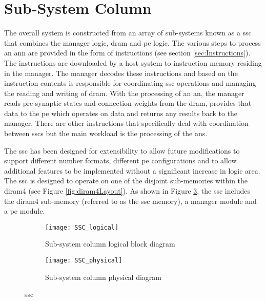 \section{Sub-System Column}
\label{sec:Sub-System Column}

The overall system is constructed from an array of sub-systems known as a \acf{ssc} that combines the manager logic, \ac{dram} and \ac{pe} logic.
The various steps to process an \ac{ann} are provided in the form of instructions (see section \ref{sec:Instructions}). 
The instructions are downloaded by a host system to instruction memory residing in the manager.
The manager decodes these instructions and based on the instruction contents is responsible for coordinating \ac{ssc} operations and managing the reading and writing of \ac{dram}.
With the processing of an \ac{an}, the manager reads pre-synaptic states and connection weights from the \ac{dram}, provides that data to the \ac{pe} which operates on data and returns any results back to the manager.
There are other instructions that specifically deal with coordination between \acp{ssc} but the main workload is the processing of the \acp{an}.

The \ac{ssc} has been designed for extensibility to allow future modifications to support different number formats, different \ac{pe} configurations and to allow additional features to be implemented without a significant increase in logic area.
The \ac{ssc} is designed to operate on one of the disjoint sub-memories within the \ac{diram4} (see Figure \ref{fig:diram4Layout}).
As shown in Figure \ref{fig:SSC}, the \ac{ssc} includes the \ac{diram4} sub-memory (referred to as the \ac{ssc} memory), a manager module and a \ac{pe} module.
\begin{figure}
\centering
\begin{subfigure}{.44\textwidth}
  \centering
  \texttt{[image: SSC\_logical]}
  \captionsetup{justification=centering, skip=10pt}
  \vspace{-6pt}
  \caption{Sub-system column logical block diagram}
  \label{fig:Sub-system Column Logical Block Diagram}
\end{subfigure}%
\begin{subfigure}{.54\textwidth}
  \centering
  \texttt{[image: SSC\_physical]}
  \captionsetup{justification=centering, skip=10pt}
  \vspace{20pt}
  \caption{Sub-system column physical diagram}
  \label{fig:Sub-system Column Physical Diagram}
\end{subfigure}
\captionsetup{justification=centering, skip=12pt}
\caption{\acf{ssc}}
\label{fig:SSC}
\end{figure}


